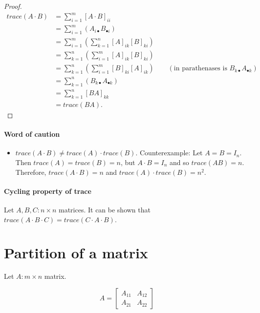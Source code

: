 \documentclass[12pt]{article}
\theoremstyle{definition}
\begin{document}
\begin{proof}
\begin{align*}
trace(A \cdot B) &= \sum_{i = 1}^{m} [A \cdot B]_{ii} \\
&= \sum_{i = 1}^{m} ( A_{i \bullet} B_{\bullet i} ) \\
&= \sum_{i = 1}^{m} \left( \sum_{k = 1}^{n} [A]_{ik} [B]_{ki} \right) \\
&= \sum_{k = 1}^{n} \left( \sum_{i = 1}^{m} [A]_{ik} [B]_{ki} \right) \\
&= \sum_{k = 1}^{n} \left( \sum_{i = 1}^{m} [B]_{ki} [A]_{ik} \right) \quad \quad (\text{in parathenases is } B_{k \bullet} A_{\bullet k}) \\
&= \sum_{k = 1}^{n} \left( B_{k \bullet} A_{\bullet k} \right) \\
&= \sum_{k = 1}^{n} [BA]_{kk} \\
&= trace(BA).
\end{align*}
\end{proof}

\paragraph{Word of caution}

\begin{itemize}
\item $trace(A \cdot B) \neq trace(A) \cdot trace(B)$.
Counterexample: Let $A = B = I_n$. Then $trace(A) = trace(B) = n$, but $A \cdot B = I_n$ and so $trace(AB) = n$.
Therefore, $trace(A \cdot B) = n$ and $trace(A) \cdot trace(B) = n^2$.
\end{itemize}

\paragraph{Cycling property of trace}
Let $A, B, C : n \times n$ matrices. It can be shown that $trace(A \cdot B \cdot C) = trace(C \cdot A \cdot B)$.

\section{Partition of a matrix}

Let $A : m \times n$ matrix.

\[
A = \left[
\begin{array}{c|c}
A_{11} & A_{12} \\ \hline
A_{21} & A_{22}
\end{array}
\right]
\]
\end{document}
